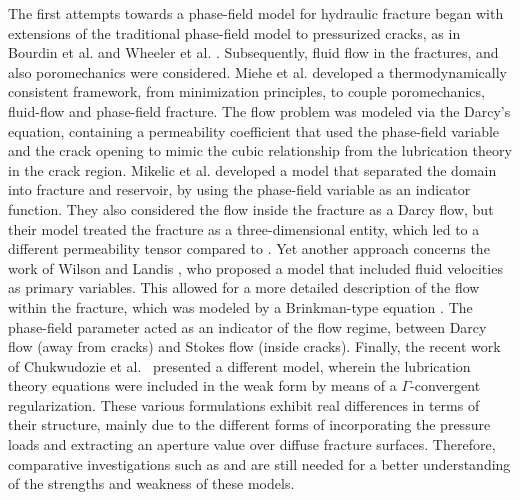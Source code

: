     The first attempts towards a phase-field model for hydraulic fracture began with extensions of the traditional phase-field model \cite{francfort1998revisiting,bourdin2000numerical} to pressurized cracks, as in Bourdin et al. \cite{bourdin2012variational} and Wheeler et al. \cite{wheeler2014augmented}. Subsequently, fluid flow in the fractures, and also poromechanics were considered. Miehe et al. \cite{miehe2015minimization, miehe2016phase} developed a thermodynamically consistent framework, from minimization principles, to couple poromechanics, fluid-flow and phase-field fracture. The flow problem was modeled via the Darcy's equation, containing a permeability coefficient that used the phase-field variable and the crack opening to mimic the cubic relationship from the lubrication theory in the crack region. Mikelic et al. \cite{mikelic2015phase1, mikelic2015phase2} developed a model that separated the domain into fracture and reservoir, by using the phase-field variable as an indicator function. They also considered the flow inside the fracture as a Darcy flow, but their model treated the fracture as a three-dimensional entity, which led to a different permeability tensor compared to \cite{miehe2015minimization, miehe2016phase}.  Yet another approach concerns the work of Wilson and Landis \cite{wilson2016phase}, who proposed a model that included fluid velocities as primary variables. This allowed for a more detailed description of the flow within the fracture, which was modeled by a Brinkman-type equation \cite{brinkman1949calculation}. The phase-field parameter acted as an indicator of the flow regime, between Darcy flow (away from cracks) and Stokes flow (inside cracks).  Finally, the recent work of Chukwudozie et al.\ \cite{chukwudozie2019variational} presented a different model, wherein the lubrication theory equations were included in the weak form by means of a $\Gamma$-convergent regularization. These various formulations exhibit real differences in terms of their structure, mainly due to the different forms of incorporating the pressure loads and extracting an aperture value over diffuse fracture surfaces. Therefore, comparative investigations such as \cite{chen2020phase} and \cite{yoshioka2020crack} are still needed for a better understanding of the strengths and weakness of these models.
    
